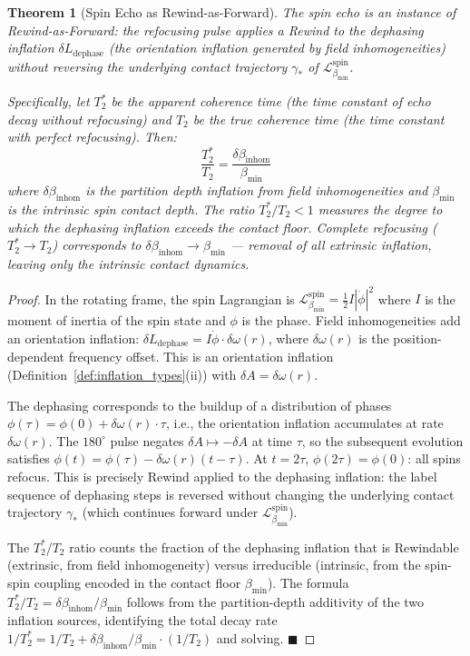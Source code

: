 \documentclass[11pt,twocolumn,a4paper]{article}
\theoremstyle{plain}
\newtheorem{theorem}{Theorem}[section]
\theoremstyle{definition}
\theoremstyle{remark}
\newcommand{\bmin}{\beta_{\min}}
\newcommand{\Lmin}{\mathcal{L}_{\bmin}}
\newcommand{\half}{\tfrac{1}{2}}
\renewcommand{\qed}{\hfill$\blacksquare$}
\begin{document}
\begin{theorem}[Spin Echo as Rewind-as-Forward]
\label{thm:spinecho}
The spin echo is an instance of Rewind-as-Forward: the refocusing pulse
applies a Rewind to the \emph{dephasing inflation} $\delta L_{\mathrm{dephase}}$
(the orientation inflation generated by field inhomogeneities) without reversing
the underlying contact trajectory $\gamma_*$ of $\Lmin^{\mathrm{spin}}$.

Specifically, let $T_2^*$ be the apparent coherence time (the time constant of
echo decay without refocusing) and $T_2$ be the true coherence time (the time
constant with perfect refocusing). Then:
\[
  \frac{T_2^*}{T_2} = \frac{\delta\beta_{\mathrm{inhom}}}{\bmin}
\]
where $\delta\beta_{\mathrm{inhom}}$ is the partition depth inflation from
field inhomogeneities and $\bmin$ is the intrinsic spin contact depth.
The ratio $T_2^*/T_2 < 1$ measures the degree to which the dephasing inflation
exceeds the contact floor. Complete refocusing ($T_2^* \to T_2$) corresponds to
$\delta\beta_{\mathrm{inhom}} \to \bmin$ --- removal of all extrinsic inflation,
leaving only the intrinsic contact dynamics.
\end{theorem}

\begin{proof}
In the rotating frame, the spin Lagrangian is $\Lmin^{\mathrm{spin}} = \half I|\dot{\phi}|^2$
where $I$ is the moment of inertia of the spin state and $\phi$ is the phase.
Field inhomogeneities add an orientation inflation: $\delta L_{\mathrm{dephase}}
= I\dot{\phi}\cdot\delta\omega(r)$, where $\delta\omega(r)$ is the
position-dependent frequency offset. This is an orientation inflation
(Definition~\ref{def:inflation_types}(ii)) with $\delta A = \delta\omega(r)$.

The dephasing corresponds to the buildup of a distribution of phases
$\phi(\tau) = \phi(0) + \delta\omega(r)\cdot\tau$, i.e., the orientation
inflation accumulates at rate $\delta\omega(r)$. The $180^\circ$ pulse negates
$\delta A \mapsto -\delta A$ at time $\tau$, so the subsequent evolution
satisfies $\phi(t) = \phi(\tau) - \delta\omega(r)(t - \tau)$. At $t = 2\tau$,
$\phi(2\tau) = \phi(0)$: all spins refocus. This is precisely Rewind applied
to the dephasing inflation: the label sequence of dephasing steps is reversed
without changing the underlying contact trajectory $\gamma_*$ (which continues
forward under $\Lmin^{\mathrm{spin}}$).

The $T_2^*$/$T_2$ ratio counts the fraction of the dephasing inflation that is
Rewindable (extrinsic, from field inhomogeneity) versus irreducible (intrinsic,
from the spin-spin coupling encoded in the contact floor $\bmin$). The formula
$T_2^*/T_2 = \delta\beta_{\mathrm{inhom}}/\bmin$ follows from the
partition-depth additivity of the two inflation sources, identifying the total
decay rate $1/T_2^* = 1/T_2 + \delta\beta_{\mathrm{inhom}}/\bmin\cdot(1/T_2)$
and solving. \qed
\end{proof}
\end{document}
